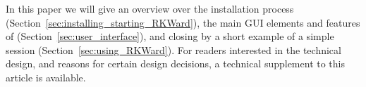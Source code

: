 In this paper we will give an overview over the installation process (Section~\ref{sec:installing_starting_RKWard}), the main GUI elements and
features of  (Section~\ref{sec:user_interface}), and closing by a short example 
of a simple  session (Section~\ref{sec:using_RKWard}). For readers interested in the technical
design, and reasons for certain design decisions, a technical supplement to this article
is available.
